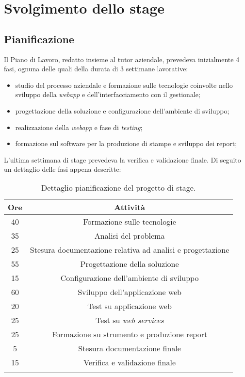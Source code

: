
\chapter{Svolgimento dello stage}
\label{cap:svolgimento-dello-stage}


\section{Pianificazione}

Il Piano di Lavoro, redatto insieme al tutor aziendale, prevedeva inizialmente 4 fasi, ognuna delle quali della durata di 3 settimane lavorative:
\begin{itemize}
	\item studio del processo aziendale e formazione sulle tecnologie coinvolte nello sviluppo della \textit{webapp} e dell'interfacciamento con il gestionale;
	\item progettazione della soluzione e configurazione dell'ambiente di sviluppo;
	\item realizzazione della \textit{webapp} e fase di \textit{testing};
	\item formazione sul software per la produzione di stampe e sviluppo dei report;
\end{itemize}
L'ultima settimana di stage prevedeva la verifica e validazione finale.
Di seguito un dettaglio delle fasi appena descritte:

\begin{center}
\begin{longtable}{|c|c|}
\hline
\textbf{Ore} & \textbf{Attività}\\
\hline
40 & Formazione sulle tecnologie\\
\hline
35 & Analisi del problema\\
\hline
25 & Stesura documentazione relativa ad analisi e progettazione\\
\hline
55 & Progettazione della soluzione\\
\hline
15 & Configurazione dell'ambiente di sviluppo\\
\hline
60 & Sviluppo dell'applicazione web\\
\hline
20 & Test su applicazione web\\
\hline
25 & Test su \textit{web services}\\
\hline
25 & Formazione su strumento e produzione report\\
\hline
5 & Stesura documentazione finale\\
\hline
15 & Verifica e validazione finale\\
\hline
\caption{Dettaglio pianificazione del progetto di stage.}
\end{longtable}
\end{center}


